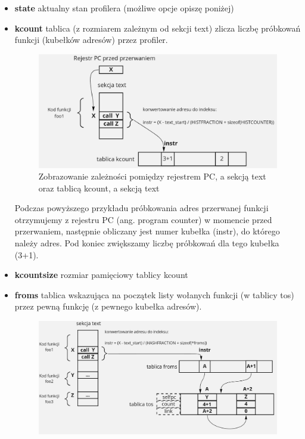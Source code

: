 \documentclass[shortabstract]{iithesis}
\theoremstyle{definition} \newtheorem*{definition}{Definicja}
\theoremstyle{definition} \newtheorem*{example}{Przykład}
\theoremstyle{definition} \newtheorem*{remark}{Uwaga}
\begin{document}
\begin{itemize}
    \item \textbf{state} aktualny stan profilera (możliwe opcje opiszę poniżej)
    \item \textbf{kcount} tablica (z rozmiarem zależnym od sekcji text) zlicza liczbę próbkowań funkcji (kubełków adresów) przez profiler.
        \begin{figure}[H]
            \centering
            \includegraphics[scale=0.3]{images/kcount.png}
            \caption{Zobrazowanie zależności pomiędzy rejestrem PC, a sekcją text oraz tablicą kcount, a sekcją text}
        \end{figure}
        Podczas powyższego przykładu próbkowania adres przerwanej funkcji otrzymujemy z rejestru PC (ang. program counter) w momencie przed przerwaniem, następnie obliczany jest numer kubełka (instr), do którego należy adres. Pod koniec zwiększamy liczbę próbkowań dla tego kubełka (3+1).
    \item \textbf{kcountsize} rozmiar pamięciowy tablicy kcount
    \item \textbf{froms} tablica wskazująca na początek listy wołanych funkcji (w tablicy tos) przez pewną funkcję (z pewnego kubełka adresów).
        \begin{figure}[H]
            \centering
            \includegraphics[scale=0.3]{images/froms.png}

\end{figure}
\end{itemize}
\end{document}
